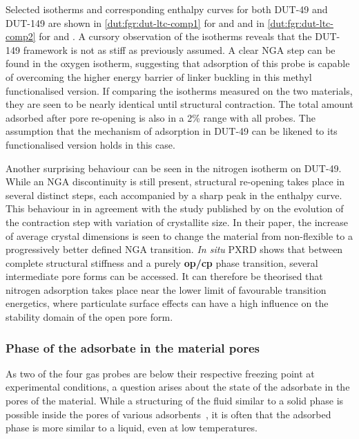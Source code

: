 Selected isotherms and corresponding enthalpy curves for both 
DUT-49 and DUT-149 are shown in \autoref{dut:fgr:dut-ltc-comp1}
for  and  and in \autoref{dut:fgr:dut-ltc-comp2}
for  and . A cursory observation of the isotherms
reveals that the DUT-149 framework is not as stiff as 
previously assumed. A clear NGA step can be found in the 
oxygen isotherm, suggesting that adsorption of this probe is capable 
of overcoming the higher energy barrier of linker buckling in 
this methyl functionalised version.
If comparing the isotherms measured on the two materials, they
are seen to be nearly identical until structural contraction.
The total amount adsorbed after pore re-opening is also in a 
2\% range with all probes. The assumption that the mechanism 
of adsorption in DUT-49 can be likened to its functionalised
version holds in this case.

Another surprising behaviour
can be seen in the nitrogen isotherm on DUT-49. While an NGA
discontinuity is still present, structural re-opening takes
place in several distinct steps, each accompanied by a sharp 
peak in the enthalpy curve. This behaviour in in
agreement with the study published by 
 \citet{krauseEffectCrystalliteSize2018}
on the evolution of the contraction step with variation of 
crystallite size. In their paper, the increase of average 
crystal dimensions is seen to change the material from non-flexible 
to a progressively better defined NGA transition. \textit{In situ} 
PXRD shows that between complete structural stiffness and a 
purely \textbf{op/cp} phase transition, several intermediate 
pore forms can be accessed. It can therefore be theorised that 
nitrogen adsorption takes place near the lower limit of 
favourable transition energetics, where particulate surface 
effects can have a high influence on the stability domain of
the open pore form.

\subsubsection{Phase of the adsorbate in the material pores}

As two of the four gas probes are below their respective freezing point
at experimental conditions, a question arises about the state of
the adsorbate in the pores of the material. While a structuring of
the fluid similar to a solid phase is possible inside the 
pores of various adsorbents~\cite{llewellynAdsorptionMFItypeZeolites1993a},
it is often that the adsorbed phase is more similar to a liquid,
even at low temperatures.

